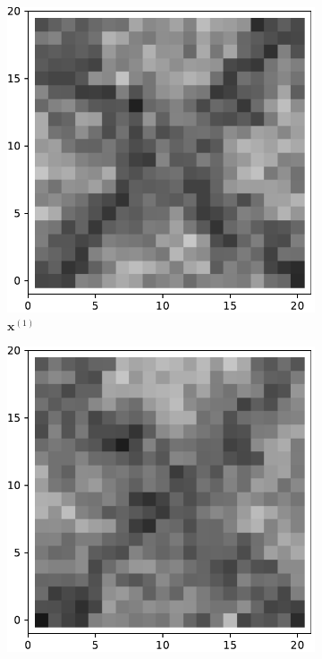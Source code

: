 \begin{figure}[!h]
\begin{subfigure}[b]{0.24\textwidth}
            \includegraphics[width=\textwidth]{./img/5d1-0.pdf}
            \caption[]%
            {{\small $\mathbf{x}^{(1)}$}}    
            \label{fig:5d11}
        \end{subfigure}
        \begin{subfigure}[b]{0.24\textwidth}   
            \centering 
            \includegraphics[width=\textwidth]{./img/5d1-99.pdf}

\end{subfigure}
\end{figure}
